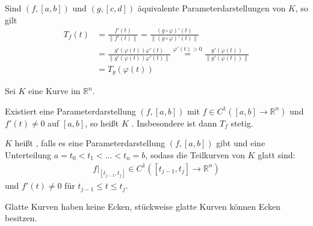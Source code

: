 \documentclass[a4paper,10pt]{scrbook}
\begin{document}
\begin{theorem}[Satz]
  Sind $(f,[a,b])$ und $(g,[c,d])$ äquivalente Parameterdarstellungen von $K$, so gilt
  \begin{align*}
    T_f(t) &= \frac{f'(t)}{\|f'(t)\|} = \frac{(g \circ \varphi)'(t)}{\|(g \circ \varphi)'(t)\|} \\
    &= \frac{g'(\varphi(t)) \varphi'(t)}{\|g'(\varphi(t)) \varphi'(t)\|} \overset{\varphi'(t) > 0}{=} \frac{g'(\varphi(t))}{\|g'(\varphi(t))\|} \\
    &= T_g(\varphi(t))
  \end{align*}
\end{theorem}

\begin{theorem}[Definition]
  Sei $K$ eine Kurve im $\mathbb{R}^n$.
  \begin{enum-arab}
    \item Existiert eine Parameterdarstellung $(f,[a,b])$ mit $f \in C^1([a,b] \to \mathbb{R}^n)$ und $f'(t) \neq 0$ auf $[a,b]$, so heißt $K$ . Insbesondere ist dann $T_f$ stetig.

    \item $K$ heißt , falls es eine Parameterdarstellung $(f,[a,b])$ gibt und eine Unterteilung $a=t_0 < t_1 < \ldots < t_n=b$, sodass die Teilkurven von $K$ glatt sind:
    \begin{align*}
      f\Big|_{[t_{j-1},t_j]} \in C^1([t_{j-1},t_j] \to \mathbb{R}^n)
    \end{align*}
    und $f'(t) \neq 0$ für $t_{j-1} \leq t \leq t_j$.
  \end{enum-arab}
\end{theorem}

\begin{notice}
  Glatte Kurven haben keine Ecken, stückweise glatte Kurven können Ecken besitzen.
\end{notice}
\end{document}
